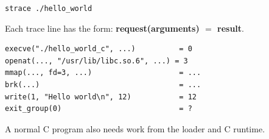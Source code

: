 \begin{slide}


	\texttt{strace ./hello_world}

	\bigskip

	Each trace line has the form: \textbf{request(arguments) $=$ result}.

\end{slide}

\begin{slide}


	\begin{verbatim}
execve("./hello_world_c", ...)          = 0
openat(..., "/usr/lib/libc.so.6", ...) = 3
mmap(..., fd=3, ...)                    = ...
brk(...)                                = ...
write(1, "Hello world\n", 12)           = 12
exit_group(0)                           = ?
	\end{verbatim}

	\medskip

	A normal C program also needs work from the loader and C runtime.

\end{slide}
